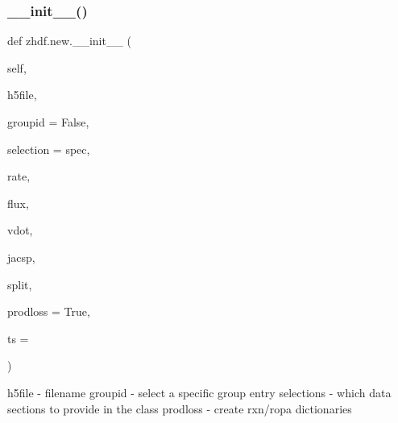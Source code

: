 \subsubsection{\texorpdfstring{\+\_\+\+\_\+init\+\_\+\+\_\+()}{\_\_init\_\_()}\hspace{0.1cm}{\footnotesize\ttfamily [2/2]}}
{\footnotesize\ttfamily def zhdf.\+new.\+\_\+\+\_\+init\+\_\+\+\_\+ (\begin{DoxyParamCaption}\item[{}]{self,  }\item[{}]{h5file,  }\item[{}]{groupid = {\ttfamily False},  }\item[{}]{selection = {\ttfamily \textquotesingle{}spec},  }\item[{}]{rate,  }\item[{}]{flux,  }\item[{}]{vdot,  }\item[{}]{jacsp,  }\item[{}]{split,  }\item[{}]{prodloss = {\ttfamily True},  }\item[{}]{ts = {} }\end{DoxyParamCaption})}

\begin{DoxyVerb}h5file     - filename
groupid    - select a specific group entry
selections - which data sections to provide in the class
prodloss   - create rxn/ropa dictionaries\end{DoxyVerb}
 
